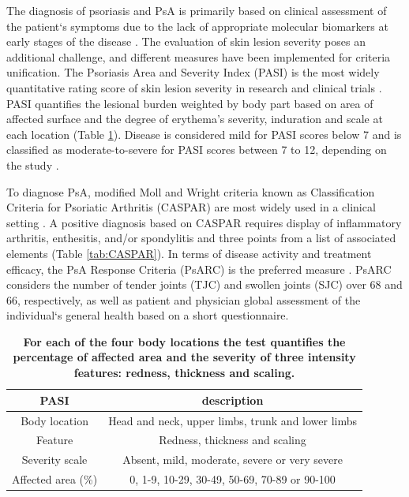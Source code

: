 The diagnosis of psoriasis and PsA is primarily based on clinical assessment of the patient`s symptoms due to the lack of appropriate molecular biomarkers at early stages of the disease \parencite{Villanova2013}. The evaluation of skin lesion severity poses an additional challenge, and different measures have been implemented for criteria unification. The Psoriasis Area and Severity Index (PASI) is the most widely quantitative rating score of skin lesion severity in research and clinical trials \parencite{Fredriksson1978,Finlay2005}. PASI quantifies the lesional burden weighted by body part based on area of affected surface and the degree of erythema’s severity, induration and scale at each location (Table \ref{tab:PASI}). Disease is considered mild for PASI scores below 7 and is classified as moderate-to-severe for PASI scores between 7 to 12, depending on the study \parencite{Finlay2005, Schmitt2005,Langewouters2008}.

To diagnose PsA, modified Moll and Wright criteria known as Classification Criteria for Psoriatic Arthritis (CASPAR) are most widely used in a clinical setting \parencite {Taylor2006}. A positive diagnosis based on CASPAR requires display of inflammatory arthritis, enthesitis, and/or spondylitis and three points from a list of associated elements (Table \ref{tab:CASPAR}). In terms of disease activity and treatment efficacy, the PsA Response Criteria (PsARC) is the preferred measure \parencite{Philipp2011,Clegg1996}. PsARC considers the number of tender joints (TJC) and swollen joints (SJC) over 68 and 66, respectively, as well as patient and physician global assessment of the individual`s general health based on a short questionnaire. 



\begin{table}[htbp]
\setlength{\tabcolsep}{20pt}
\renewcommand{\arraystretch}{1.5}
\begin{tabular}{@{} c c}
\textbf{PASI} & \textbf{description} \\
\midrule
\midrule
Body location  & Head and neck, upper limbs, trunk and lower limbs\\
Feature        & Redness, thickness and scaling \\
Severity scale & Absent, mild, moderate, severe or very severe \\
Affected area (\%)  & 0, 1-9, 10-29, 30-49, 50-69, 70-89 or 90-100 \\
\bottomrule
\end{tabular}
\medskip %
\caption[Variables and scoring used in the Psoriasis Area and Severity Index (PASI)]{\textbf{For each of the four body locations the test quantifies the percentage of affected area and the severity of three intensity features: redness, thickness and scaling.}}
\label{tab:PASI}
\end{table}
\bigskip %




